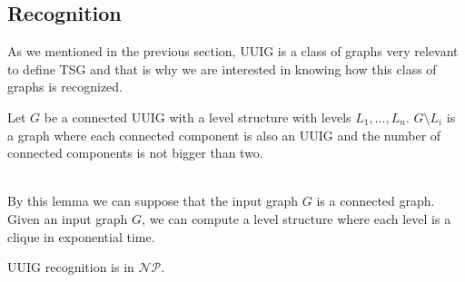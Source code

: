 \subsection{Recognition}

As we mentioned in the previous section, UUIG is a class of graphs very relevant to define TSG and that is why we are interested in knowing how this class of graphs is recognized.

\begin{lemma}
  Let $G$ be a connected UUIG with a level structure with levels $L_1,\dots,L_n$. $G\setminus L_i$ is a graph where each connected component is also an UUIG and the number of connected components is not bigger than two.
\end{lemma}

\\


By this lemma we can suppose that the input graph $G$ is a connected graph. Given an input graph $G$, we can compute a level structure where each level is a clique in exponential time.

\begin{theorem}
  UUIG recognition is in $\mathcal{NP}$.
\end{theorem}

